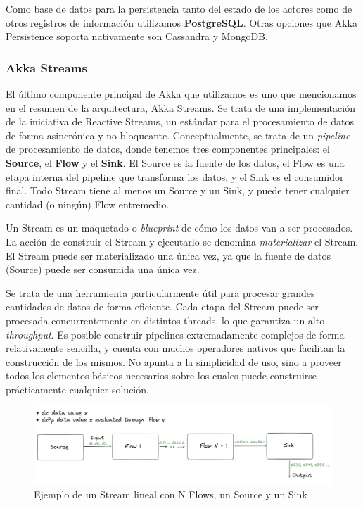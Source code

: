 Como base de datos para la persistencia tanto del estado de los actores como de otros registros de información utilizamos
\textbf{PostgreSQL}. Otras opciones que Akka Persistence soporta nativamente son Cassandra y MongoDB.

\subsubsection{Akka Streams}

\noindent El último componente principal de Akka que utilizamos es uno que mencionamos en el resumen de la arquitectura, Akka Streams.
Se trata de una implementación de la iniciativa de Reactive Streams, un estándar para el procesamiento de datos de forma asincrónica y no bloqueante.
Conceptualmente, se trata de un \textit{pipeline} de procesamiento de datos, donde tenemos tres componentes principales: el \textbf{Source},
el \textbf{Flow} y el \textbf{Sink}. El Source es la fuente de los datos, el Flow es una etapa interna del pipeline que transforma los datos, y el
Sink es el consumidor final. Todo Stream tiene al menos un Source y un Sink, y puede tener cualquier cantidad (o ningún) Flow entremedio.

Un Stream es un maquetado o \textit{blueprint} de cómo los datos van a ser procesados. La acción de construir el Stream y ejecutarlo se denomina
\textit{materializar} el Stream. El Stream puede ser materializado una única vez, ya que la fuente de datos (Source) puede ser consumida una única vez.

Se trata de una herramienta particularmente útil para procesar grandes cantidades de datos de forma eficiente. Cada etapa del Stream puede ser procesada
concurrentemente en distintos threads, lo que garantiza un alto \textit{throughput}. Es posible construir pipelines extremadamente complejos de forma relativamente
sencilla, y cuenta con muchos operadores nativos que facilitan la construcción de los mismos. No apunta a la simplicidad de uso, sino a proveer todos los elementos
básicos necesarios sobre los cuales puede construirse prácticamente cualquier solución.

\begin{figure}[htbp]
    \centering
    \includegraphics[width=1.0\textwidth]{../assets/akka-stream-example.png}
    \caption{Ejemplo de un Stream lineal con N Flows, un Source y un Sink}
\end{figure}

